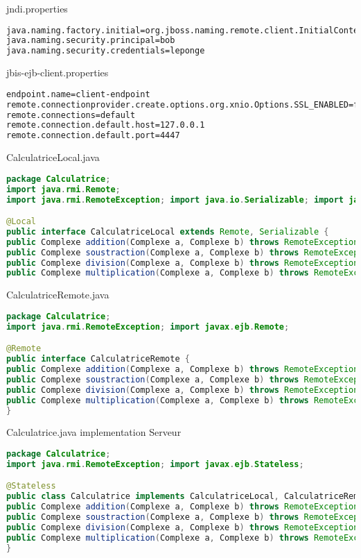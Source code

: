 \documentclass{article}
\begin{document}
jndi.properties
\begin{lstlisting}[language=bash]
java.naming.factory.initial=org.jboss.naming.remote.client.InitialContextFactory java.naming.provider.url=remote://127.0.0.1:4447
java.naming.security.principal=bob
java.naming.security.credentials=leponge
\end{lstlisting}

jbis-ejb-client.properties
\begin{lstlisting}[language=bash]
endpoint.name=client-endpoint
remote.connectionprovider.create.options.org.xnio.Options.SSL_ENABLED=false
remote.connections=default
remote.connection.default.host=127.0.0.1
remote.connection.default.port=4447
\end{lstlisting}


CalculatriceLocal.java
\begin{lstlisting}[language=JAVA]
package Calculatrice;
import java.rmi.Remote;
import java.rmi.RemoteException; import java.io.Serializable; import javax.ejb.Local;

@Local
public interface CalculatriceLocal extends Remote, Serializable {
public Complexe addition(Complexe a, Complexe b) throws RemoteException;
public Complexe soustraction(Complexe a, Complexe b) throws RemoteException;
public Complexe division(Complexe a, Complexe b) throws RemoteException, DivisionParZero;
public Complexe multiplication(Complexe a, Complexe b) throws RemoteException;
\end{lstlisting}

CalculatriceRemote.java
\begin{lstlisting}[language=JAVA]
package Calculatrice;
import java.rmi.RemoteException; import javax.ejb.Remote;

@Remote
public interface CalculatriceRemote {
public Complexe addition(Complexe a, Complexe b) throws RemoteException;
public Complexe soustraction(Complexe a, Complexe b) throws RemoteException;
public Complexe division(Complexe a, Complexe b) throws RemoteException, DivisionParZero;
public Complexe multiplication(Complexe a, Complexe b) throws RemoteException;
}
\end{lstlisting}

Calculatrice.java implementation Serveur
\begin{lstlisting}[language=JAVA]
package Calculatrice;
import java.rmi.RemoteException; import javax.ejb.Stateless;

@Stateless
public class Calculatrice implements CalculatriceLocal, CalculatriceRemote {
public Complexe addition(Complexe a, Complexe b) throws RemoteException {return a.plus(b);}
public Complexe soustraction(Complexe a, Complexe b) throws RemoteException {return a.minus(b);}
public Complexe division(Complexe a, Complexe b) throws RemoteException, DivisionParZero {`return a.divide(b);}
public Complexe multiplication(Complexe a, Complexe b) throws RemoteException {return a.times(b);}
}
\end{lstlisting}
\end{document}
